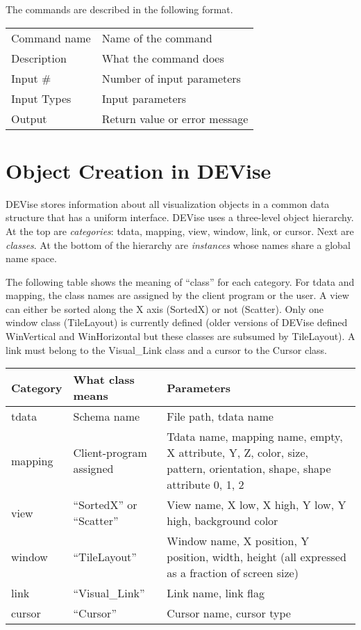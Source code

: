 The commands are described in the following format.

\bigskip

\noindent
\begin{tabular}{l|p{5in}}
\hline
Command name & Name of the command \\
Description  & What the command does \\
Input \#     & Number of input parameters \\
Input Types  & Input parameters \\
Output       & Return value or error message \\
\hline
\end{tabular}

\section{Object Creation in DEVise\protect\label{objcreate}}

DEVise stores information about all visualization objects in a common
data structure that has a uniform interface. DEVise uses a three-level
object hierarchy. At the top are {\em categories}: tdata, mapping,
view, window, link, or cursor. Next are {\em classes}. At the bottom
of the hierarchy are {\em instances} whose names share a global name
space.

The following table shows the meaning of ``class'' for each category.
For tdata and mapping, the class names are assigned by the client
program or the user. A view can either be sorted along the X axis
(SortedX) or not (Scatter). Only one window class (TileLayout) is
currently defined (older versions of DEVise defined WinVertical and
WinHorizontal but these classes are subsumed by TileLayout). A link
must belong to the Visual\_Link class and a cursor to the Cursor
class.

\bigskip

\noindent
\begin{tabular}{l|l|p{4in}}
Category & What class means           & Parameters\\
\hline
tdata    & Schema name                & File path, tdata name \\
mapping  & Client-program assigned    & Tdata name, mapping name, empty,
                                        X attribute, Y, Z, color, size,
                                        pattern, orientation, shape,
                                        shape attribute 0, 1, 2 \\
view     & ``SortedX'' or ``Scatter'' & View name, X low, X high, Y low,
                                        Y high, background color \\
window   & ``TileLayout''             & Window name, X position, Y position,
                                        width, height (all expressed as a
                                        fraction of screen size) \\
link     & ``Visual\_Link''           & Link name, link flag \\
cursor   & ``Cursor''                 & Cursor name, cursor type \\
\hline
\end{tabular}

